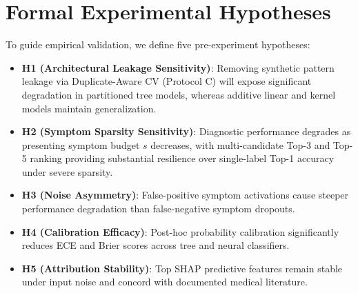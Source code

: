 \section{Formal Experimental Hypotheses}
\label{sec:hypotheses}

To guide empirical validation, we define five pre-experiment hypotheses:
\begin{itemize}
    \item \textbf{H1 (Architectural Leakage Sensitivity)}: Removing synthetic pattern leakage via Duplicate-Aware CV (Protocol C) will expose significant degradation in partitioned tree models, whereas additive linear and kernel models maintain generalization.
    \item \textbf{H2 (Symptom Sparsity Sensitivity)}: Diagnostic performance degrades as presenting symptom budget $s$ decreases, with multi-candidate Top-3 and Top-5 ranking providing substantial resilience over single-label Top-1 accuracy under severe sparsity.
    \item \textbf{H3 (Noise Asymmetry)}: False-positive symptom activations cause steeper performance degradation than false-negative symptom dropouts.
    \item \textbf{H4 (Calibration Efficacy)}: Post-hoc probability calibration significantly reduces ECE and Brier scores across tree and neural classifiers.
    \item \textbf{H5 (Attribution Stability)}: Top SHAP predictive features remain stable under input noise and concord with documented medical literature.
\end{itemize}
